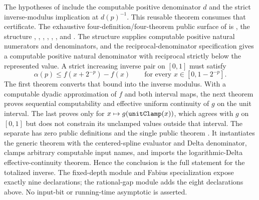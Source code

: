 \documentclass[11pt,oneside]{article}
\theoremstyle{definition}
\theoremstyle{remark}
\newcommand{\lean}[1]{%
  \ifmmode\text{\texttt{\detokenize{#1}}}\else\nolinkurl{#1}\fi}
\begin{document}
The hypotheses of  include the
computable positive denominator \(d\) and the strict inverse-modulus
implication at \(d(p)^{-1}\).  This reusable theorem consumes that certificate.
The exhaustive four-definition/four-theorem public surface of
 is
, the structure
,
,
,
,
,
, and
.
The structure supplies computable positive natural numerators and denominators,
and the reciprocal-denominator specification gives a computable positive
natural denominator with reciprocal strictly below the represented value.  A
strict increasing inverse pair on \([0,1]\) must satisfy
\[
 \alpha(p)\le f(x+2^{-p})-f(x)
 \qquad\text{for every }x\in[0,1-2^{-p}].
\]
The first theorem converts that bound into the inverse modulus.  With a
computable dyadic approximation of \(f\) and both interval maps, the next
theorem proves sequential computability and effective uniform continuity of
\(g\) on the unit interval.  The last proves
 only for
\(x\mapsto g(\lean{unitClamp}(x))\), which agrees with \(g\) on \([0,1]\) but
does not constrain its unclamped values outside that interval.  The separate
 has zero public definitions and the single
public theorem .  It
instantiates the generic theorem with the centered-spline evaluator and Delta
denominator, clamps arbitrary computable input names, and imports the
logarithmic-Delta effective-continuity theorem.  Hence the conclusion is the
full  statement for the totalized inverse.
The fixed-depth module and Fabius specialization expose exactly nine
declarations; the rational-gap module adds the eight declarations above.  No
input-bit or running-time asymptotic is asserted.
\end{document}
